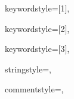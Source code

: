 {%
keywordstyle=[1]{\ttfamily\color{keywordcolor}},

keywordstyle=[2]{\ttfamily\color{sortcolor}},

keywordstyle=[3]{\ttfamily\color{errorcolor}},



stringstyle={\ttfamily\color{stringcolor}},

commentstyle={\ttfamily\itshape\color{commentcolor}},

}
